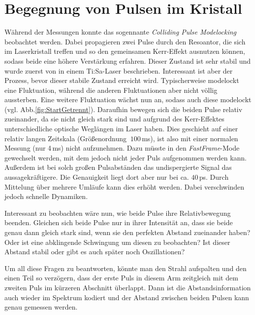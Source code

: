 \documentclass[bachelor,       %
               twoside,        %
               BCOR10mm,       %
               liststotoc,nomtotoc,bibtotoc, %
               english,ngerman, %
               final,          %
               ]{GAUBM}
\begin{document}
\section{Begegnung von Pulsen im Kristall}
\label{sec:cpml}
Während der Messungen konnte das sogennante \textit{Colliding Pulse Modelocking} beobachtet werden.
Dabei propagieren zwei Pulse durch den Resoantor, die sich im Laserkristall treffen und so den gemeinsamen Kerr-Effekt ausnutzen können, sodass beide eine höhere Verstärkung erfahren.
Dieser Zustand ist sehr stabil und wurde zuerst von \cite{lai_multiple_1997} in einem Ti:Sa-Laser beschrieben.
Interessant ist aber der Prozess, bevor dieser stabile Zustand erreicht wird.
Typischerweise modelockt eine Fluktuation, während die anderen Fluktuationen aber nicht völlig aussterben.
Eine weitere Fluktuation wächst nun an, sodass auch diese modelockt (vgl. Abb.\ref{fig:StartGetrennt}).
Daraufhin bewegen sich die beiden Pulse relativ zueinander, da sie nicht gleich stark sind und aufgrund des Kerr-Effektes unterschiedliche optische Weglängen im Laser haben.
Dies geschieht auf einer relativ langen Zeitskala (Größenordnung $~100\,$ms), ist also mit einer normalen Messung (nur 4\,ms) nicht aufzunehmen.
Dazu müsste in den \textit{FastFrame}-Mode gewechselt werden, mit dem jedoch nicht jeder Puls aufgenommen werden kann.
Außerdem ist bei solch großen Pulsabständen das undispergierte Signal das aussagekräftigere.
Die Genauigkeit liegt dort aber nur bei ca. $40\,$ps.
Durch Mittelung über mehrere Umläufe kann dies erhöht werden.
Dabei verschwinden jedoch schnelle Dynamiken.

Interessant zu beobachten wäre nun, wie beide Pulse ihre Relativbewegung beenden.
Gleichen sich beide Pulse nur in ihrer Intensität an, dass sie beide genau dann gleich stark sind, wenn sie den perfekten Abstand zueinander haben?
Oder ist eine abklingende Schwingung um diesen zu beobachten?
Ist dieser Abstand stabil oder gibt es auch später noch Oszillationen?

Um all diese Fragen zu beantworten, könnte man den Strahl aufspalten und den einen Teil so verzögern, dass der erste Puls in diesem Arm zeitgleich mit dem zweiten Puls im kürzeren Abschnitt überlappt.
Dann ist die Abstandsinformation auch wieder im Spektrum kodiert und der Abstand zwischen beiden Pulsen kann genau gemessen werden.
\end{document}
